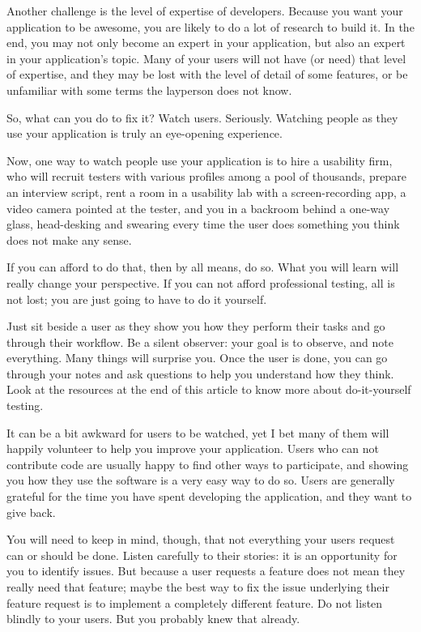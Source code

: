 Another challenge is the level of expertise of developers. Because you want your application to be awesome, you are likely to do a lot of research to build it. In the end, you may not only become an expert in your application, but also an expert in your application's topic. Many of your users will not have (or need) that level of expertise, and they may be lost with the level of detail of some features, or be unfamiliar with some terms the layperson does not know.

So, what can you do to fix it? Watch users. Seriously. Watching people as they use your application is truly an eye-opening experience.

Now, one way to watch people use your application is to hire a usability firm, who will recruit testers with various profiles among a pool of thousands, prepare an interview script, rent a room in a usability lab with a screen-recording app, a video camera pointed at the tester, and you in a backroom behind a one-way glass, head-desking and swearing every time the user does something you think does not make any sense.

If you can afford to do that, then by all means, do so. What you will learn will really change your perspective. If you can not afford professional testing, all is not lost; you are just going to have to do it yourself.

Just sit beside a user as they show you how they perform their tasks and go through their workflow. Be a silent observer: your goal is to observe, and note everything. Many things will surprise you. Once the user is done, you can go through your notes and ask questions to help you understand how they think. Look at the resources at the end of this article to know more about do-it-yourself testing.

It can be a bit awkward for users to be watched, yet I bet many of them will happily volunteer to help you improve your application. Users who can not contribute code are usually happy to find other ways to participate, and showing you how they use the software is a very easy way to do so. Users are generally grateful for the time you have spent developing the application, and they want to give back.

You will need to keep in mind, though, that not everything your users request can or should be done. Listen carefully to their stories: it is an opportunity for you to identify issues. But because a user requests a feature does not mean they really need that feature; maybe the best way to fix the issue underlying their feature request is to implement a completely different feature. Do not listen blindly to your users. But you probably knew that already. 

